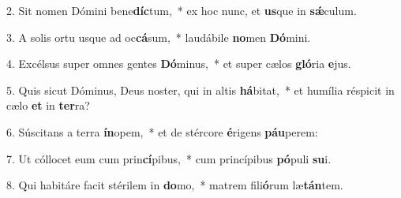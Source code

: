 2. Sit nomen Dómini bene\textbf{díc}tum,~*  ex hoc nunc, et \textbf{us}que in \textbf{sǽ}culum.\

3. A solis ortu usque ad oc\textbf{cá}sum,~*  laudábile \textbf{no}men \textbf{Dó}mini.\

4. Excélsus super omnes gentes \textbf{Dó}minus,~*  et super cælos \textbf{gló}ria \textbf{e}jus.\

5. Quis sicut Dóminus, Deus noster, qui in altis \textbf{há}bitat,~*  et humília réspicit in cælo \textbf{et} in \textbf{ter}ra?\

6. Súscitans a terra \textbf{ín}opem,~*  et de stércore \textbf{é}rigens \textbf{páu}perem:\

7. Ut cóllocet eum cum prin\textbf{cí}pibus,~*  cum princípibus \textbf{pó}puli \textbf{su}i.\

8. Qui habitáre facit stérilem in \textbf{do}mo,~*  matrem fili\textbf{ó}rum læ\textbf{tán}tem.\

